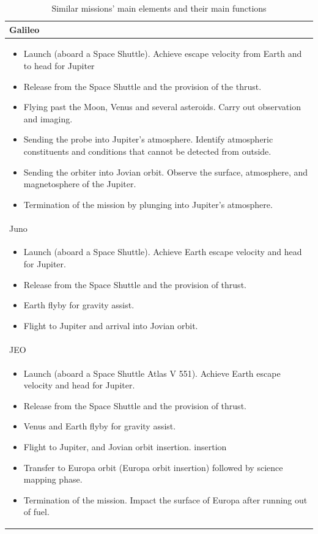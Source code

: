 \begin{longtable}{p{}}
  \caption{Similar missions' main elements and their main functions}
  \\ \toprule

  Galileo \\* \midrule

  \begin{itemize}
  \item Launch (aboard a Space Shuttle). Achieve escape velocity from
    Earth and to head for Jupiter
  \item Release from the Space Shuttle and the provision of the
    thrust.
  \item Flying past the Moon, Venus and several asteroids. Carry out
    observation and imaging.
  \item Sending the probe into Jupiter's atmosphere. Identify
    atmospheric constituents and conditions that cannot be detected
    from outside.
  \item Sending the orbiter into Jovian orbit. Observe the surface,
    atmosphere, and magnetosphere of the Jupiter.
  \item Termination of the mission by plunging into Jupiter's
    atmosphere.
  \end{itemize} \\

  Juno \\* \midrule

  \begin{itemize}
  \item Launch (aboard a Space Shuttle). Achieve Earth escape velocity
    and head for Jupiter.
  \item Release from the Space Shuttle and the provision of thrust.
  \item Earth flyby for gravity assist.
  \item Flight to Jupiter and arrival into Jovian orbit.
  \end{itemize} \\

  JEO \\* \midrule

  \begin{itemize}
  \item Launch (aboard a Space Shuttle Atlas V 551). Achieve Earth
   escape velocity and head for Jupiter.
  \item Release from the Space Shuttle and the provision of thrust.
  \item Venus and Earth flyby for gravity assist.
  \item Flight to Jupiter, and Jovian orbit insertion.  insertion
  \item Transfer to Europa orbit (Europa orbit insertion) followed by
    science mapping phase.
  \item Termination of the mission. Impact the surface of Europa after
    running out of fuel.
  \end{itemize} \\


\end{longtable}
